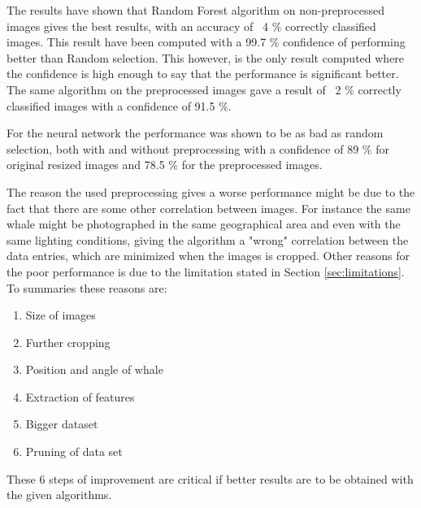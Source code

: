
The results have shown that Random Forest algorithm on non-preprocessed images gives the best results, with an accuracy of ~4 \% correctly classified images. This result have been computed with a 99.7 \% confidence of performing better than Random selection. This however, is the only result computed where the confidence is high enough to say that the performance is significant better.
The same algorithm on the preprocessed images gave a result of ~2 \% correctly classified images with a confidence of 91.5 \%.

For the neural network the performance was shown to be as bad as random selection, both with and without preprocessing with a confidence of 89 \% for original resized images and 78.5 \% for the preprocessed images.

The reason the used preprocessing gives a worse performance might be due to the fact that there are some other correlation between images. For instance the same whale might be photographed in the same geographical area and even with the same lighting conditions, giving the algorithm a "wrong" correlation between the data entries, which are minimized when the images is cropped.
Other reasons for the poor performance is due to the limitation stated in Section \ref{sec:limitations}.
To summaries these reasons are:
\begin{enumerate}
\item Size of images 
\item Further cropping
\item Position and angle of whale
\item Extraction of features
\item Bigger dataset
\item Pruning of data set
\end{enumerate}
These 6 steps of improvement are critical if better results are to be obtained with the given algorithms. 

